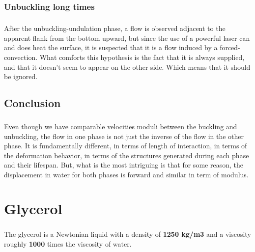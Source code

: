 \documentclass[a4paper,10pt]{report}
\begin{document}
\subsection{Unbuckling long times}
\paragraph{}
After the unbuckling-undulation phase, a flow is observed adjacent to the apparent flank from the bottom upward, but since the use of a powerful laser can and does heat the surface, it is suspected that it is a flow induced by a forced-convection. What comforts this hypothesis is the fact that it is always supplied, and that it doesn't seem to appear on the other side. Which means that it should be ignored.

\section{Conclusion}
\paragraph{}
Even though we have comparable velocities moduli between the buckling and unbuckling, the flow in one phase is not just the inverse of the flow in the other phase. It is fundamentally different, in terms of length of interaction, in terms of the deformation behavior, in terms of the structures generated during each phase and their lifespan. But, what is the most intriguing is that for some reason, the displacement in water for both phases is forward and similar in term of modulus.
























\chapter{Glycerol}
\paragraph{}
The glycerol is a Newtonian liquid with a density of \textbf{1250 kg/m3} and a viscosity roughly \textbf{1000} times the viscosity of water.
\end{document}
